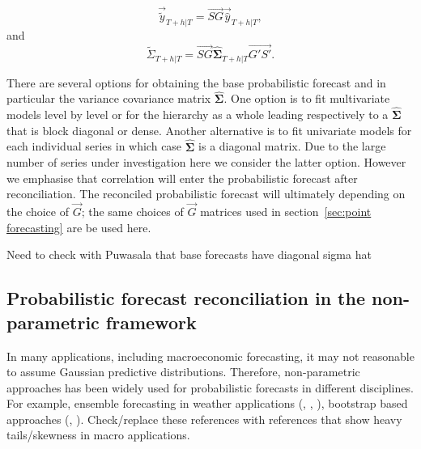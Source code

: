 \documentclass[graybox]{svmult}
\begin{document}
\begin{equation}\label{eq:rec mean}
\vec{\tilde{y}}_{T+h|T} = \vec{SG}\vec{\hat{y}}_{T+h|T},
\end{equation}
and
\begin{equation}\label{eq:rec var}
\tilde{\Sigma}_{T+h|T} = \vec{SG}\hat{\bm{\Sigma}}_{T+h|T}\vec{G'S'}.
\end{equation}

There are several options for obtaining the base probabilistic forecast and in particular the variance covariance matrix $\hat{\bm{\Sigma}}$.  One option is to fit multivariate models level by level or for the hierarchy as a whole leading respectively to a $\hat{\bm \Sigma}$ that is block diagonal or dense.  Another alternative is to fit univariate models for each individual series in which case $\hat{\bm{\Sigma}}$ is a diagonal matrix. Due to the large number of series under investigation here we consider the latter option.  However we emphasise that correlation will enter the probabilistic forecast after reconciliation.  The reconciled probabilistic forecast will ultimately depending on the choice of $\vec{G}$; the same choices of $\vec{G}$ matrices used in section~\ref{sec:point forecasting} are be used here.

{\color{red} Need to check with Puwasala that base forecasts have diagonal sigma hat}

\subsection{Probabilistic forecast reconciliation in the non-parametric framework}

In many applications, including macroeconomic forecasting, it may not reasonable to assume Gaussian predictive distributions. Therefore, non-parametric approaches has been widely used for probabilistic forecasts in different disciplines. For example, ensemble forecasting in weather applications (\cite{Gneiting2005}, \cite{Gneiting2014}, \cite{Gneiting2008}), bootstrap based approaches (\cite{Manzan2008}, \cite{Vilar2013}). {\color{red} Check/replace these references with references that show heavy tails/skewness in macro applications.}
\end{document}
